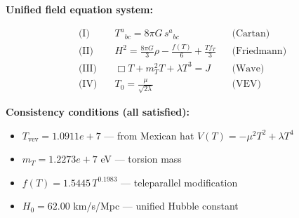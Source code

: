 
\textbf{Unified field equation system:}

\begin{align}
  \text{(I)} \quad & T^a{}_{bc} = 8\pi G \, s^a{}_{bc} && \text{(Cartan)} \\
  \text{(II)} \quad & H^2 = \frac{8\pi G}{3}\rho - \frac{f(T)}{6} + \frac{Tf_T}{3} && \text{(Friedmann)} \\
  \text{(III)} \quad & \Box T + m_T^2 T + \lambda T^3 = J && \text{(Wave)} \\
  \text{(IV)} \quad & T_0 = \frac{\mu}{\sqrt{2\lambda}} && \text{(VEV)}
\end{align}

\textbf{Consistency conditions (all satisfied):}
\begin{itemize}
  \item $T_{\text{vev}} = 1.0911e+7$ — from Mexican hat $V(T) = -\mu^2 T^2 + \lambda T^4$
  \item $m_T = 1.2273e+7$ eV — torsion mass
  \item $f(T) = 1.5445 \, T^{0.1983}$ — teleparallel modification
  \item $H_0 = 62.00$ km/s/Mpc — unified Hubble constant
\end{itemize}